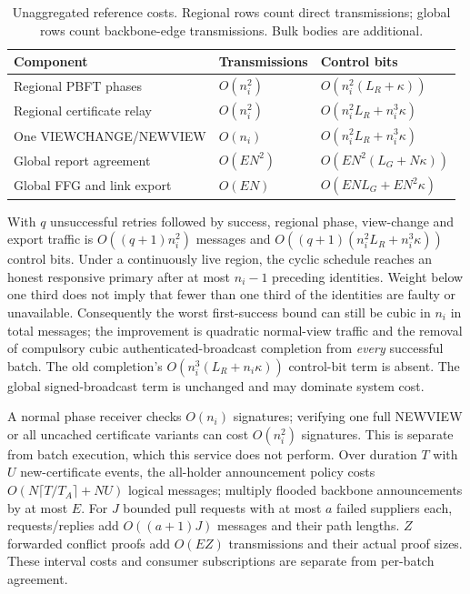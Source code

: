 \documentclass[11pt,a4paper,onecolumn]{article}
\theoremstyle{remark}\newtheorem{example}[definition]{Example}
\begin{document}
\begin{table}[htbp]\centering\small
\begin{tabularx}{\textwidth}{@{}p{}p{}Y@{}}\toprule
Component & Transmissions & Control bits\\\midrule
Regional PBFT phases & $O(n_i^2)$ & $O(n_i^2(L_R+\kappa))$\\
Regional certificate relay & $O(n_i^2)$ & $O(n_i^2L_R+n_i^3\kappa)$\\
One VIEWCHANGE/NEWVIEW & $O(n_i)$ & $O(n_i^2L_R+n_i^3\kappa)$\\
Global report agreement & $O(EN^2)$ & $O(EN^2(L_G+N\kappa))$\\
Global FFG and link export & $O(EN)$ & $O(ENL_G+EN^2\kappa)$\\\bottomrule
\end{tabularx}
\caption{Unaggregated reference costs. Regional rows count direct transmissions;
global rows count backbone-edge transmissions. Bulk bodies are additional.}
\end{table}

With $q$ unsuccessful retries followed by success, regional phase, view-change
and export traffic is $O((q+1)n_i^2)$ messages and
$O((q+1)(n_i^2L_R+n_i^3\kappa))$ control bits. Under a continuously live region,
the cyclic schedule reaches an honest responsive primary after at most
$n_i-1$ preceding identities. Weight below one third does not imply that fewer
than one third of the identities are faulty or unavailable. Consequently the
worst first-success bound can still be cubic in $n_i$ in total messages; the
improvement is quadratic normal-view traffic and the removal of compulsory
cubic authenticated-broadcast completion from \emph{every} successful batch.
The old completion's $O(n_i^3(L_R+n_i\kappa))$ control-bit term is absent.
The global signed-broadcast term is unchanged and may dominate system cost.

A normal phase receiver checks $O(n_i)$ signatures; verifying one full
NEWVIEW or all uncached certificate variants can cost $O(n_i^2)$ signatures.
This is separate from batch execution, which this service does not perform.
Over duration $T$ with $U$ new-certificate events, the all-holder announcement
policy costs $O(N\lceil T/T_A\rceil+NU)$ logical messages; multiply flooded
backbone announcements by at most $E$. For $J$ bounded pull requests with at
most $a$ failed suppliers each, requests/replies add $O((a+1)J)$ messages and
their path lengths. $Z$ forwarded conflict proofs add $O(EZ)$ transmissions
and their actual proof sizes. These interval costs and consumer subscriptions
are separate from per-batch agreement.
\end{document}
